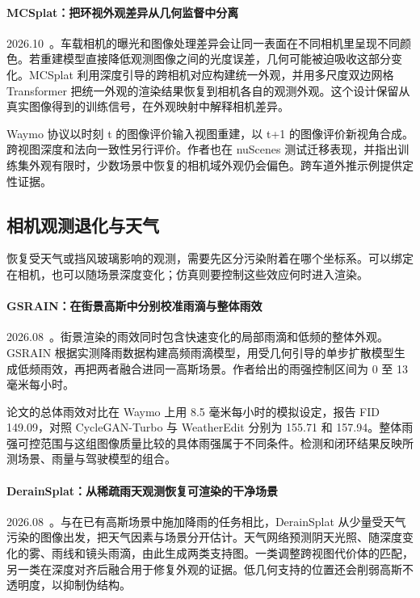 \paragraph{MCSplat：把环视外观差异从几何监督中分离}
2026.10~\cite{2610_25345}。车载相机的曝光和图像处理差异会让同一表面在不同相机里呈现不同颜色。若重建模型直接降低观测图像之间的光度误差，几何可能被迫吸收这部分变化。MCSplat 利用深度引导的跨相机对应构建统一外观，并用多尺度双边网格 Transformer 把统一外观的渲染结果恢复到相机各自的观测外观。这个设计保留从真实图像得到的训练信号，在外观映射中解释相机差异。

Waymo 协议以时刻 t 的图像评价输入视图重建，以 t+1 的图像评价新视角合成。跨视图深度和法向一致性另行评价。作者也在 nuScenes 测试迁移表现，并指出训练集外观有限时，少数场景中恢复的相机域外观仍会偏色。跨车道外推示例提供定性证据。

\subsection{相机观测退化与天气}

恢复受天气或挡风玻璃影响的观测，需要先区分污染附着在哪个坐标系。可以绑定在相机，也可以随场景深度变化；仿真则要控制这些效应何时进入渲染。

\paragraph{GSRAIN：在街景高斯中分别校准雨滴与整体雨效}
2026.08~\cite{2608_02177}。街景渲染的雨效同时包含快速变化的局部雨滴和低频的整体外观。GSRAIN 根据实测降雨数据构建高频雨滴模型，用受几何引导的单步扩散模型生成低频雨效，再把两者融合进同一高斯场景。作者给出的雨强控制区间为 0 至 13 毫米每小时。

论文的总体雨效对比在 Waymo 上用 8.5 毫米每小时的模拟设定，报告 FID 149.09，对照 CycleGAN-Turbo 与 WeatherEdit 分别为 155.71 和 157.94。整体雨强可控范围与这组图像质量比较的具体雨强属于不同条件。检测和闭环结果反映所测场景、雨量与驾驶模型的组合。

\paragraph{DerainSplat：从稀疏雨天观测恢复可渲染的干净场景}
2026.08~\cite{2608_02191}。与在已有高斯场景中施加降雨的任务相比，DerainSplat 从少量受天气污染的图像出发，把天气因素与场景分开估计。天气网络预测阴天光照、随深度变化的雾、雨线和镜头雨滴，由此生成两类支持图。一类调整跨视图代价体的匹配，另一类在深度对齐后融合用于修复外观的证据。低几何支持的位置还会削弱高斯不透明度，以抑制伪结构。

